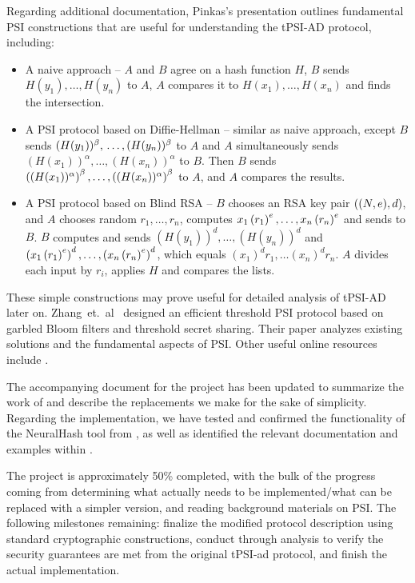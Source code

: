 Regarding additional documentation, Pinkas's presentation \cite{pinkas2015} outlines fundamental PSI constructions that are useful for understanding the tPSI-AD protocol, including:
\begin{itemize}
 	\item A naive approach -- $A$ and $B$ agree on a hash function $H$, $B$ sends $H(y_1),\dots, H(y_n)$ to $A$, $A$ compares it to $H(x_1),\dots, H(x_n)$ and finds the intersection.
 	\item A PSI protocol based on Diffie-Hellman -- similar as naive approach, except $B$ sends $(H(y_1))^{\beta}, \\\dots, (H(y_n))^{\beta}$ to $A$ and $A$ simultaneously sends $(H(x_1))^{\alpha}, \dots , (H(x_n))^{\alpha}$ to $B$. Then $B$ sends  $\left((H(x_1))^{\alpha}\right)^{\beta},\dots, \left((H(x_n))^{\alpha}\right)^{\beta}$ to $A$, and $A$ compares the results.
 	\item A PSI protocol based on Blind RSA -- $B$ chooses an RSA key pair $\left( (N,e), d\right)$, and $A$ chooses random $r_1, \dots, r_n$, computes $x_1  \left(r_1\right)^{e}, \dots, x_n  \left(r_n\right)^{e}$ and sends to $B$. $B$ computes and sends $(H(y_1))^{d},\dots, (H(y_n))^{d}$ and $\left(x_1  \left(r_1\right)^{e}\right)^{d}, \dots, \left(x_n  \left(r_n\right)^{e}\right)^d$, which equals $(x_1)^d r_1, \dots (x_n)^d r_n$. $A$ divides each input by $r_i$, applies $H$ and compares the lists.
 \end{itemize} 
These simple constructions may prove useful for detailed analysis of tPSI-AD later on. 
Zhang~et.~al~\cite{zhang2021efficient} designed an efficient threshold PSI protocol based on garbled Bloom filters and threshold secret sharing. Their paper analyzes existing solutions and the fundamental aspects of PSI.
Other useful online resources include \cite{yanai2020,lewis2021}.

The accompanying document for the project has been updated to summarize the work of \cite{bhowmick2021apple} and describe the replacements we make for the sake of simplicity. Regarding the implementation, we have tested and confirmed the functionality of the NeuralHash tool from \cite{cheerlaNeuralHashAdversarialSteganographic2021}, as well as identified the relevant documentation and examples within \cite{pythoncrypto2021}.


The project is approximately 50\% completed, with the bulk of the progress coming from determining what actually needs to be implemented/what can be replaced with a simpler version, and reading background materials on PSI. The following milestones remaining: finalize the modified protocol description using standard cryptographic constructions, conduct through analysis to verify the security guarantees are met from the original tPSI-ad protocol, and finish the actual implementation.



